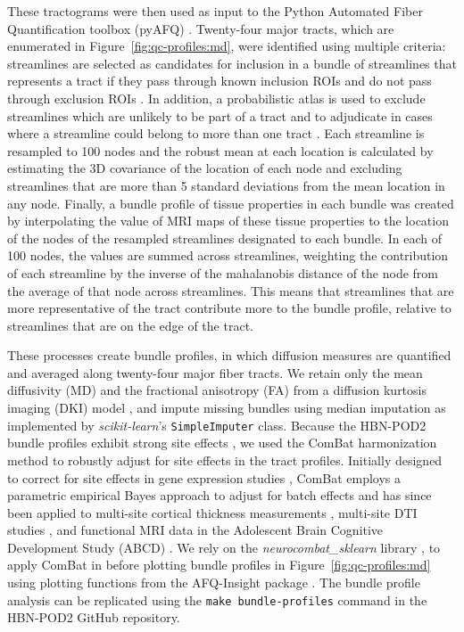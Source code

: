 \documentclass[9pt,lineno]{elife}
\begin{document}
These tractograms were then used as input to the Python Automated Fiber
Quantification toolbox (pyAFQ) \citep{kruper2021evaluating}. Twenty-four major
tracts, which are enumerated in Figure~\ref{fig:qc-profiles:md}, were identified using
multiple criteria: streamlines are selected as candidates for inclusion in a
bundle of streamlines that represents a tract if they pass through known
inclusion ROIs and do not pass through exclusion ROIs \citep{Wakana2007-nw}. In
addition, a probabilistic atlas is used to exclude streamlines which are
unlikely to be part of a tract and to adjudicate in cases where a streamline
could belong to more than one tract \citep{Hua2008-di}. Each streamline is
resampled to 100 nodes and the robust mean at each location is calculated by
estimating the 3D covariance of the location of each node and excluding
streamlines that are more than 5 standard deviations from the mean location in
any node. Finally, a bundle profile of tissue properties in each bundle was
created by interpolating the value of MRI maps of these tissue properties to the
location of the nodes of the resampled streamlines designated to each bundle. In
each of 100 nodes, the values are summed across streamlines, weighting the
contribution of each streamline by the inverse of the mahalanobis distance of
the node from the average of that node across streamlines. This means that
streamlines that are more representative of the tract contribute more to the
bundle profile, relative to streamlines that are on the edge of the tract.

These processes create bundle profiles, in which diffusion measures are
quantified and averaged along twenty-four major fiber tracts. We retain only the
mean diffusivity (MD) and the fractional anisotropy (FA) from a diffusion
kurtosis imaging (DKI) model \citep{jensen2005-ta}, and impute missing bundles
using median imputation as implemented by \emph{scikit-learn}'s
\texttt{SimpleImputer} class. 
Because the HBN-POD2 bundle
profiles exhibit strong site effects \citep{richie-halford2021multidimensional},
we used the ComBat harmonization method to robustly adjust for site effects in
the tract profiles. Initially designed to correct for site effects in gene
expression studies \citep{Johnson2007-kl}, ComBat employs a parametric empirical
Bayes approach to adjust for batch effects and has since been applied to
multi-site cortical thickness measurements \citep{fortin2018-hk}, multi-site DTI
studies \citep{fortin2017-be}, and functional MRI data in the Adolescent Brain
Cognitive Development Study (ABCD) \citep{nielson2018detecting}. We rely on the
\emph{neurocombat\_sklearn} library \citep{neurocombat-sklearn}, to apply ComBat in
before plotting bundle profiles in Figure~\ref{fig:qc-profiles:md} using
plotting functions from the AFQ-Insight package
\citep{richie-halford2019insight}. The bundle profile analysis can be replicated
using the \texttt{make bundle-profiles} command in the HBN-POD2 GitHub
repository.
\end{document}
